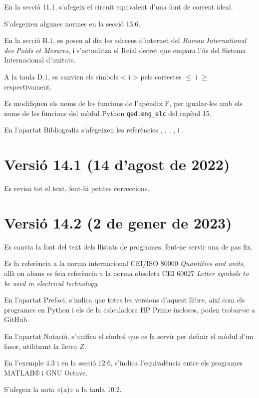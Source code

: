 En la secció 11.1, s'afegeix el circuit equivalent d'una font de corrent ideal.

S'afegeixen algunes normes en la secció 13.6.

En la secció B.1, es posen al dia les adreces d'internet  del \textit{Bureau International des Poids et Mesures}, i s'actualitza el Reial decret que empara l'ús del Sistema Internacional d'unitats.

A la taula D.1, es canvien els símbols < i > pels correctes $\leq$ i $\geq$ respectivament.

Es modifiquen els noms de les funcions de l'apèndix F, per igualar-les amb els noms de les funcions del mòdul Python \texttt{qed.eng\_elc} del capítol 15.

En l'apartat Bibliografia s'afegeixen les referències \cite{SUM},  \cite{RAM}, \cite{JOH}, \cite{HIL}, \cite{ZUM} i \cite{VAN}.



\section*{Versió 14.1 (14 d'agost de 2022)}

Es revisa tot el text, fent-hi petites correccions.


\section*{Versió 14.2 (2 de gener de 2023)}

Es canvia la font del text dels llistats de programes, fent-ne servir una de pas fix.

Es fa referència a  la norma internacional CEI/ISO 80000 \textit{Quantities and units}, allà on abans es feia referència  a la norma obsoleta CEI 60027 \textit{Letter symbols to be used in electrical technology}.

En l'apartat Prefaci, s'indica que totes les versions d'aquest llibre, així com els programes en Python i els de la calculadora \textsf{HP Prime} inclosos, poden trobar-se a GitHub.

En l'apartat Notació, s'unifica el símbol que es fa servir per definir el mòdul d'un fasor, utilitzant la lletra $Z$.

En l'exemple 4.3 i en la secció  12.6, s'indica l'equivalència entre els programes MATLAB® i GNU Octave.

S'afegeix la nota «(a)» a la taula 10.2.

